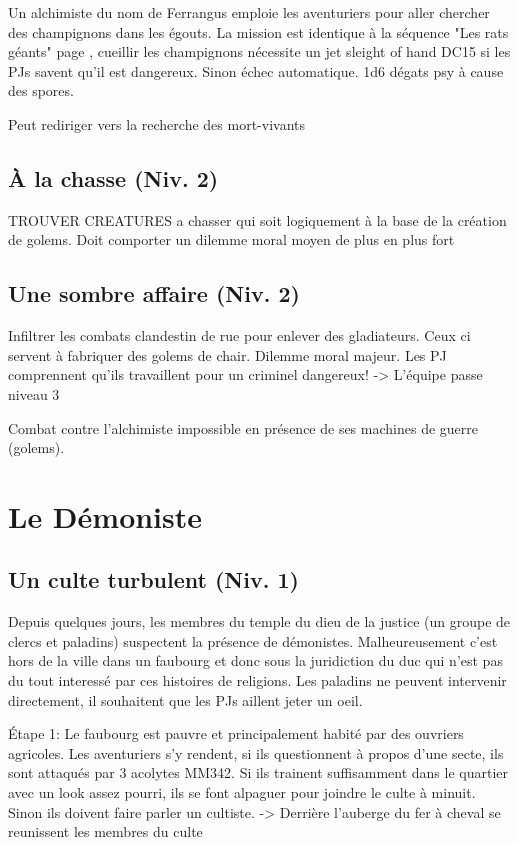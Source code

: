 Un alchimiste du nom de Ferrangus emploie les aventuriers pour aller chercher des champignons dans les
égouts. La mission est identique à la séquence "Les rats géants" page \pageref{ss:RatsGeants}, cueillir 
les champignons nécessite un jet sleight of hand DC15
si les PJs savent qu'il est dangereux. Sinon échec automatique. 1d6 dégats psy à cause des spores.

Peut rediriger vers la recherche des mort-vivants 

\subsection{À la chasse (Niv. 2)}

TROUVER CREATURES a chasser qui soit logiquement à la base de la création de golems. Doit comporter
un dilemme moral moyen de plus en plus fort

\subsection{Une sombre affaire (Niv. 2)}

Infiltrer les combats clandestin de rue pour enlever des gladiateurs. Ceux ci servent à fabriquer
des golems de chair. Dilemme moral majeur. Les PJ comprennent qu'ils travaillent pour un criminel
dangereux!
 -> L'équipe passe niveau 3

Combat contre l'alchimiste impossible en présence de ses machines de guerre (golems).

\section{Le Démoniste}

\subsection{Un culte turbulent (Niv. 1)}

Depuis quelques jours, les membres du temple du dieu de la justice (un groupe de clercs et paladins) 
suspectent la présence de démonistes. Malheureusement c'est hors de la ville dans un faubourg 
et donc sous la juridiction du duc qui n'est pas du tout interessé par ces histoires de religions.
Les paladins ne peuvent intervenir directement, il souhaitent que les PJs aillent jeter un oeil.

Étape 1: Le faubourg est pauvre et principalement habité par des ouvriers agricoles. Les aventuriers
s'y rendent, si ils questionnent à propos d'une secte, ils sont attaqués par 3 acolytes MM342. Si ils
trainent suffisamment dans le quartier avec un look assez pourri, ils se font alpaguer pour joindre le 
culte à minuit. Sinon ils doivent faire parler un cultiste.
-> Derrière l'auberge du fer à cheval se reunissent les membres du culte

